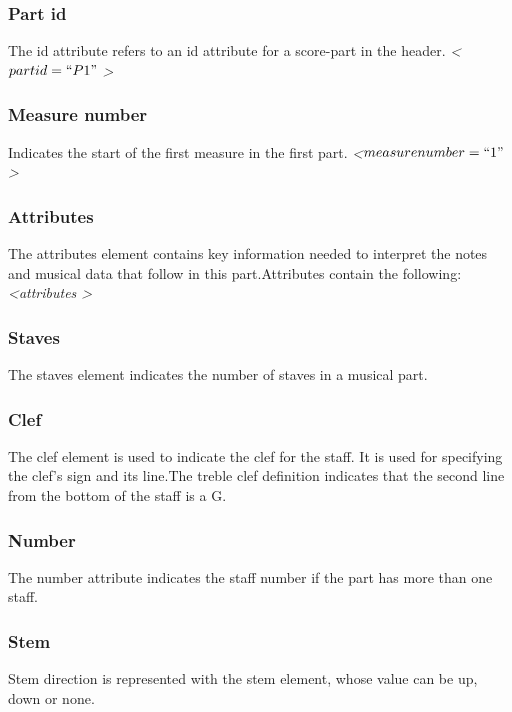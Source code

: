 \documentclass[journal]{IEEEtran}
\begin{document}
\subsubsection{ Part id}
The id attribute refers to an id attribute for a score-part in the header. \newline
\textit{ \textless $part id=``P1" $ \textgreater } 

\subsubsection{ Measure number}
Indicates the start of the first measure in the first part.\newline
\textit{ \textless $measure number=``1" $ \textgreater } 

\subsubsection{Attributes}
The attributes element contains key information needed to interpret the notes and musical data
that follow in this part.Attributes contain the following:
\textit{ \textless  attributes \textgreater } 

\subsubsection{ Staves}
The staves element indicates the number of staves in a musical part.

\subsubsection{Clef}
The clef element is used to indicate the clef for the staff. It is used for specifying the clef’s sign
and its line.The treble clef definition indicates that the second line from the bottom of the staff is a G.

\subsubsection{Number}
The number attribute indicates the staff number if the part has more than one staff.

\subsubsection{Stem}
Stem direction is represented with the stem element, whose value can be up, down or none.
\end{document}

